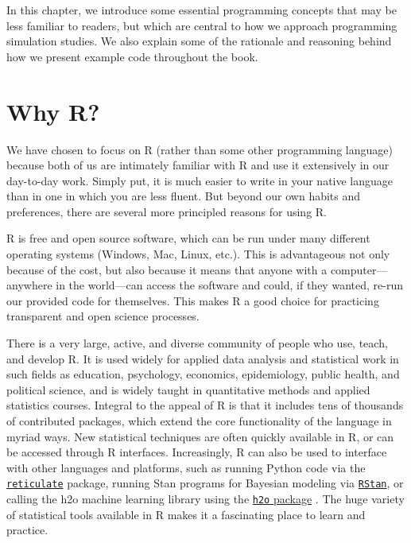 \documentclass[
]{book}
\begin{document}
In this chapter, we introduce some essential programming concepts that may be less familiar to readers, but which are central to how we approach programming simulation studies.
We also explain some of the rationale and reasoning behind how we present example code throughout the book.

\section{Why R?}\label{why-r}

We have chosen to focus on R (rather than some other programming language) because both of us are intimately familiar with R and use it extensively in our day-to-day work.
Simply put, it is much easier to write in your native language than in one in which you are less fluent.
But beyond our own habits and preferences, there are several more principled reasons for using R.

R is free and open source software, which can be run under many different operating systems (Windows, Mac, Linux, etc.).
This is advantageous not only because of the cost, but also because it means that anyone with a computer---anywhere in the world---can access the software and could, if they wanted, re-run our provided code for themselves.
This makes R a good choice for practicing transparent and open science processes.

There is a very large, active, and diverse community of people who use, teach, and develop R.
It is used widely for applied data analysis and statistical work in such fields as education, psychology, economics, epidemiology, public health, and political science,
and is widely taught in quantitative methods and applied statistics courses.
Integral to the appeal of R is that it includes tens of thousands of contributed packages, which extend the core functionality of the language in myriad ways.
New statistical techniques are often quickly available in R, or can be accessed through R interfaces.
Increasingly, R can also be used to interface with other languages and platforms, such as running Python code via the \href{https://rstudio.github.io/reticulate/}{\texttt{reticulate}} package, running Stan programs for Bayesian modeling via \href{https://mc-stan.org/users/interfaces/rstan}{\texttt{RStan}}, or calling the h2o machine learning library using the \href{https://cran.r-project.org/package=h2o}{\texttt{h2o} package} \citep{fryda2014H2oInterfaceH2O}.
The huge variety of statistical tools available in R makes it a fascinating place to learn and practice.
\end{document}
